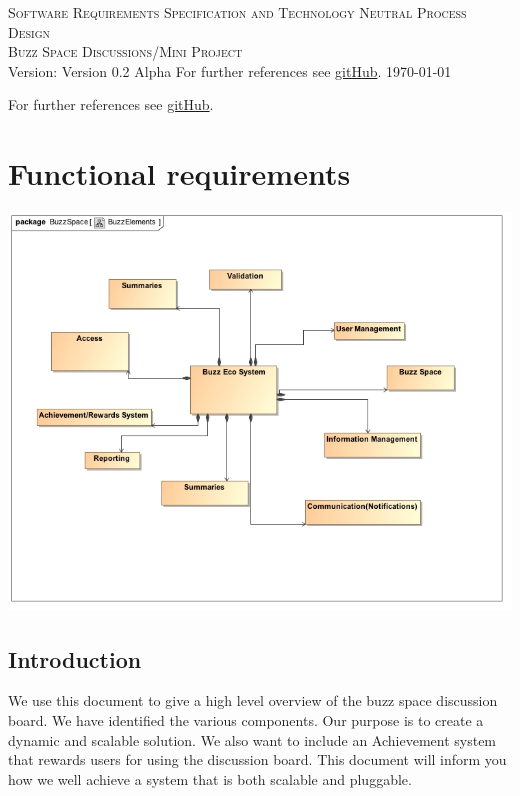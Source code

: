\documentclass[a4paper,12pt]{report}
\begin{document}
\renewcommand{\thesection}{\arabic{section}}
\newpage
\begin{center}
\textsc{\LARGE Software Requirements Specification and Technology Neutral Process Design}\\[1.5cm]
\textsc{\Large Buzz Space Discussions/Mini Project}\\[0.5cm]
Version: Version 0.2 Alpha 
For further references see \href{http://www.sharelatex.com}{gitHub}.
\today
\end{center}
\tableofcontents{}
For further references see \href{http://www.sharelatex.com}{gitHub}.
\section{Functional requirements}
	\begin{center}
  	 	\includegraphics[width=1\textwidth] {./Diagrams/MainDiagram.jpg}\\[0.4cm]    
	\end{center}
\subsection{Introduction}
We use this document to give a high level overview of the buzz space discussion board. We have identified the various components. Our purpose is to create a dynamic and scalable solution. We also want to include an Achievement system that rewards users for using the discussion board. This document will inform you how we well achieve a system that is both scalable and pluggable.
\newpage
\end{document}
